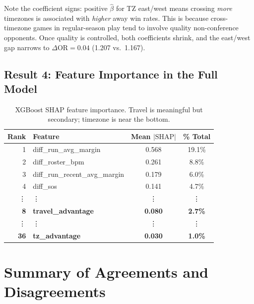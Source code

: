 \documentclass[11pt]{article}
\begin{document}
\noindent Note the coefficient signs: positive $\hat{\beta}$ for TZ east/west means crossing \emph{more} timezones is associated with \emph{higher} away win rates. This is because cross-timezone games in regular-season play tend to involve quality non-conference opponents. Once quality is controlled, both coefficients shrink, and the east/west gap narrows to $\Delta\text{OR} = 0.04$ (1.207 vs.\ 1.167).

\subsection{Result 4: Feature Importance in the Full Model}

\begin{table}[h]
\centering
\begin{tabular}{rlcc}
\toprule
Rank & Feature & Mean $|\text{SHAP}|$ & \% Total \\
\midrule
1 & diff\_run\_avg\_margin & 0.568 & 19.1\% \\
2 & diff\_roster\_bpm & 0.261 & 8.8\% \\
3 & diff\_run\_recent\_avg\_margin & 0.179 & 6.0\% \\
4 & diff\_sos & 0.141 & 4.7\% \\
\vdots & \vdots & \vdots & \vdots \\
\textbf{8} & \textbf{travel\_advantage} & \textbf{0.080} & \textbf{2.7\%} \\
\vdots & \vdots & \vdots & \vdots \\
\textbf{36} & \textbf{tz\_advantage} & \textbf{0.030} & \textbf{1.0\%} \\
\bottomrule
\end{tabular}
\caption{XGBoost SHAP feature importance. Travel is meaningful but secondary; timezone is near the bottom.}
\label{tab:shap}
\end{table}

\section{Summary of Agreements and Disagreements}
\end{document}
